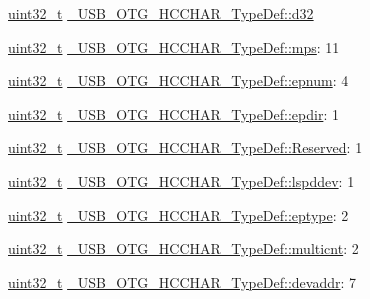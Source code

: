 \begin{DoxyCompactItemize}
\begin{tabbing}
\end{tabbing}\item 
\hyperlink{stdint_8h_a435d1572bf3f880d55459d9805097f62}{uint32\-\_\-t} \hyperlink{group___u_s_b___o_t_g___d_r_i_v_e_r_ga0a0a2fc3e4194e8dd800311c652a6391}{\-\_\-\-U\-S\-B\-\_\-\-O\-T\-G\-\_\-\-H\-C\-C\-H\-A\-R\-\_\-\-Type\-Def\-::d32}
\item 
\hyperlink{stdint_8h_a435d1572bf3f880d55459d9805097f62}{uint32\-\_\-t} \hyperlink{group___u_s_b___o_t_g___d_r_i_v_e_r_ga5b4ec8eb01d4007623b8fc18806013d3}{\-\_\-\-U\-S\-B\-\_\-\-O\-T\-G\-\_\-\-H\-C\-C\-H\-A\-R\-\_\-\-Type\-Def\-::mps}\-: 11
\item 
\hyperlink{stdint_8h_a435d1572bf3f880d55459d9805097f62}{uint32\-\_\-t} \hyperlink{group___u_s_b___o_t_g___d_r_i_v_e_r_ga7e2db9d035440c79fe20394c7f2f6fb2}{\-\_\-\-U\-S\-B\-\_\-\-O\-T\-G\-\_\-\-H\-C\-C\-H\-A\-R\-\_\-\-Type\-Def\-::epnum}\-: 4
\item 
\hyperlink{stdint_8h_a435d1572bf3f880d55459d9805097f62}{uint32\-\_\-t} \hyperlink{group___u_s_b___o_t_g___d_r_i_v_e_r_ga69aafd73ac0b1c4a83b7991da998294a}{\-\_\-\-U\-S\-B\-\_\-\-O\-T\-G\-\_\-\-H\-C\-C\-H\-A\-R\-\_\-\-Type\-Def\-::epdir}\-: 1
\item 
\hyperlink{stdint_8h_a435d1572bf3f880d55459d9805097f62}{uint32\-\_\-t} \hyperlink{group___u_s_b___o_t_g___d_r_i_v_e_r_ga9195441c8e492c17349fe9493e41a76a}{\-\_\-\-U\-S\-B\-\_\-\-O\-T\-G\-\_\-\-H\-C\-C\-H\-A\-R\-\_\-\-Type\-Def\-::\-Reserved}\-: 1
\item 
\hyperlink{stdint_8h_a435d1572bf3f880d55459d9805097f62}{uint32\-\_\-t} \hyperlink{group___u_s_b___o_t_g___d_r_i_v_e_r_ga4ee44e963bbcf08680aa896b5f39d7d7}{\-\_\-\-U\-S\-B\-\_\-\-O\-T\-G\-\_\-\-H\-C\-C\-H\-A\-R\-\_\-\-Type\-Def\-::lspddev}\-: 1
\item 
\hyperlink{stdint_8h_a435d1572bf3f880d55459d9805097f62}{uint32\-\_\-t} \hyperlink{group___u_s_b___o_t_g___d_r_i_v_e_r_gabe6638f1fbc9a10f9f2281165abdf5f9}{\-\_\-\-U\-S\-B\-\_\-\-O\-T\-G\-\_\-\-H\-C\-C\-H\-A\-R\-\_\-\-Type\-Def\-::eptype}\-: 2
\item 
\hyperlink{stdint_8h_a435d1572bf3f880d55459d9805097f62}{uint32\-\_\-t} \hyperlink{group___u_s_b___o_t_g___d_r_i_v_e_r_ga26e4da68bd807a1a39feacaa0bdb550a}{\-\_\-\-U\-S\-B\-\_\-\-O\-T\-G\-\_\-\-H\-C\-C\-H\-A\-R\-\_\-\-Type\-Def\-::multicnt}\-: 2
\item 
\hyperlink{stdint_8h_a435d1572bf3f880d55459d9805097f62}{uint32\-\_\-t} \hyperlink{group___u_s_b___o_t_g___d_r_i_v_e_r_ga920950b9ba271e9946f53170718fef00}{\-\_\-\-U\-S\-B\-\_\-\-O\-T\-G\-\_\-\-H\-C\-C\-H\-A\-R\-\_\-\-Type\-Def\-::devaddr}\-: 7

\end{DoxyCompactItemize}
